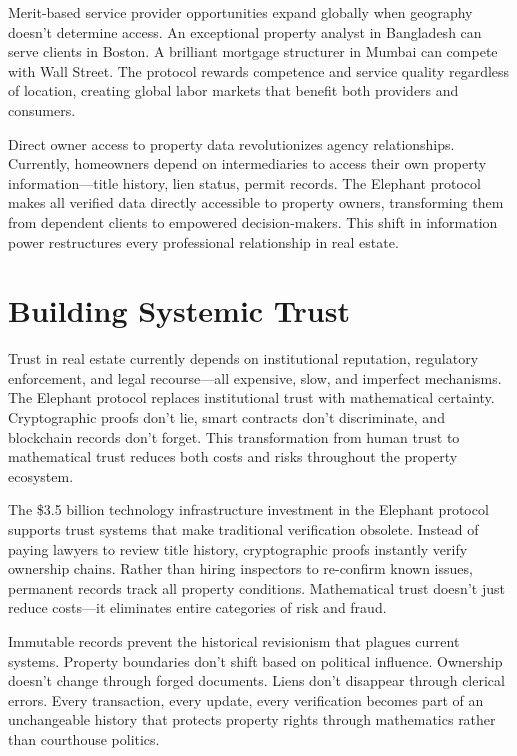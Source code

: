 Merit-based service provider opportunities expand globally when geography doesn't determine access. An exceptional property analyst in Bangladesh can serve clients in Boston. A brilliant mortgage structurer in Mumbai can compete with Wall Street. The protocol rewards competence and service quality regardless of location, creating global labor markets that benefit both providers and consumers.

Direct owner access to property data revolutionizes agency relationships. Currently, homeowners depend on intermediaries to access their own property information—title history, lien status, permit records. The Elephant protocol makes all verified data directly accessible to property owners, transforming them from dependent clients to empowered decision-makers. This shift in information power restructures every professional relationship in real estate.

\section{Building Systemic Trust}

Trust in real estate currently depends on institutional reputation, regulatory enforcement, and legal recourse—all expensive, slow, and imperfect mechanisms. The Elephant protocol replaces institutional trust with mathematical certainty. Cryptographic proofs don't lie, smart contracts don't discriminate, and blockchain records don't forget. This transformation from human trust to mathematical trust reduces both costs and risks throughout the property ecosystem.

The \$3.5 billion technology infrastructure investment in the Elephant protocol supports trust systems that make traditional verification obsolete. Instead of paying lawyers to review title history, cryptographic proofs instantly verify ownership chains. Rather than hiring inspectors to re-confirm known issues, permanent records track all property conditions. Mathematical trust doesn't just reduce costs—it eliminates entire categories of risk and fraud.

Immutable records prevent the historical revisionism that plagues current systems. Property boundaries don't shift based on political influence. Ownership doesn't change through forged documents. Liens don't disappear through clerical errors. Every transaction, every update, every verification becomes part of an unchangeable history that protects property rights through mathematics rather than courthouse politics.

